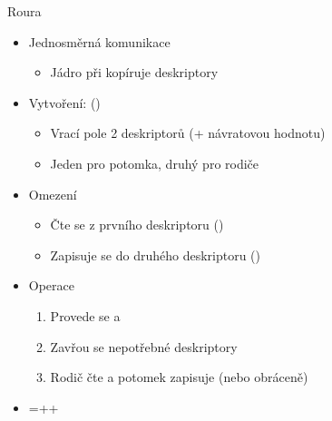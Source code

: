 
\begin{frame}{Roura}

  \begin{itemize}
    \item Jednosměrná komunikace
    \begin{itemize}
      \item Jádro při  kopíruje deskriptory
    \end{itemize}

    \pause

    \item Vytvoření:  ()
    \begin{itemize}
      \item Vrací pole 2 deskriptorů (+ návratovou hodnotu)
      \item Jeden pro potomka, druhý pro rodiče
    \end{itemize}

    \pause

    \item Omezení
    \begin{itemize}
      \item Čte se z prvního deskriptoru ()
      \item Zapisuje se do druhého deskriptoru ()
    \end{itemize}

    \pause

    \item Operace
    \begin{enumerate}
      \item Provede se  a 
      \item Zavřou se nepotřebné deskriptory
      \item Rodič čte a potomek zapisuje (nebo obráceně)
    \end{enumerate}

    \pause

    \item {}=++
  \end{itemize}

\end{frame}


